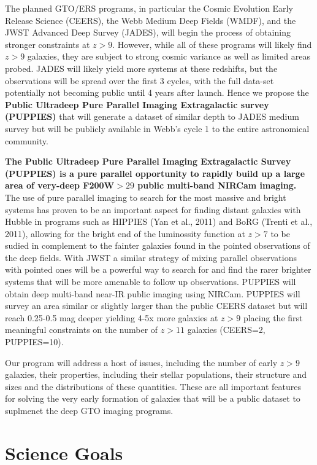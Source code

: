 \documentclass[12pt]{article}
\begin{document}
The planned GTO/ERS programs, in particular the Cosmic Evolution Early Release Science (CEERS), the Webb Medium Deep Fields (WMDF), and the JWST Advanced Deep Survey (JADES), will begin the process of obtaining stronger constraints at $z>9$.   However, while all of these programs will likely find $z > 9$ galaxies, they are subject to strong cosmic variance as well as limited areas probed.  JADES will likely yield more systems at these redshifts, but the observations will be spread over the first 3 cycles, with the full data-set potentially not becoming public until 4 years after launch. Hence we propose the \textbf{Public Ultradeep Pure Parallel Imaging Extragalactic survey (PUPPIES)} that will generate a dataset of similar depth to JADES medium survey but will be publicly available in Webb's cycle 1 to the entire astronomical community. 


{\bf The Public Ultradeep Pure Parallel Imaging Extragalactic Survey (PUPPIES) is a pure parallel opportunity to rapidly build up a large area of very-deep F200W$>29$ public multi-band NIRCam imaging.}  The use of pure parallel imaging to search for the most massive and bright systems has proven to be an important aspect for finding distant galaxies with Hubble in programs such as HIPPIES (Yan et al., 2011) and BoRG (Trenti et al., 2011), allowing for the bright end of the luminossity function at $z > 7$ to be sudied in complement to the fainter galaxies found in the pointed observations of the deep fields.  With JWST a similar strategy of mixing parallel observations with pointed ones will be a powerful way to search for and find the rarer brighter systems that will be more amenable to follow up observations.   PUPPIES will obtain deep multi-band near-IR public imaging using NIRCam. PUPPIES will survey an area similar or slightly larger than the public CEERS dataset but will reach 0.25-0.5 mag deeper yielding 4-5x more galaxies at $z > 9$ placing the first meaningful constraints on the number of $z > 11$ galaxies (CEERS=2, PUPPIES=10).

Our program will address a host of issues, including the number of early $z > 9$ galaxies, their properties, including their stellar populations, their structure and sizes and the distributions of these quantities.  These are all important features for solving the very early formation of galaxies that will be a public dataset to suplmenet the deep GTO imaging programs.

\section{Science Goals}
\end{document}

